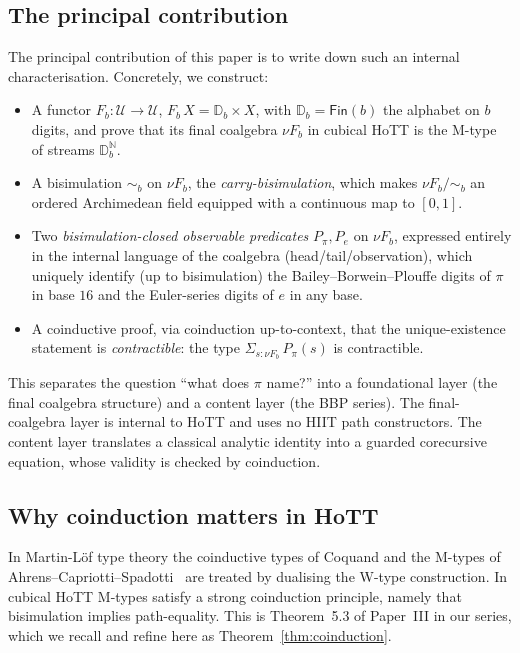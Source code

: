 \documentclass[12pt]{article}
\theoremstyle{definition}
\theoremstyle{remark}
\newcommand{\Type}{\mathcal{U}}
\newcommand{\N}{\mathbb{N}}
\newcommand{\D}{\mathbb{D}}
\newcommand{\bisim}{\mathrel{\sim}}
\begin{document}
\subsection{The principal contribution}

The principal contribution of this paper is to write down such an
internal characterisation. Concretely, we construct:

\begin{itemize}
\item A functor $F_b: \Type \to \Type$, $F_b\,X = \D_b \times X$, with
$\D_b = \mathsf{Fin}(b)$ the alphabet on $b$ digits, and prove that
its final coalgebra $\nu F_b$ in cubical HoTT is the M-type of
streams $\D_b^\N$.
\item A bisimulation $\bisim_b$ on $\nu F_b$, the
\emph{carry-bisimulation}, which makes $\nu F_b / \bisim_b$ an
ordered Archimedean field equipped with a continuous map to $[0,1]$.
\item Two \emph{bisimulation-closed observable predicates}
$P_\pi, P_e$ on $\nu F_b$, expressed entirely in the internal
language of the coalgebra (head/tail/observation), which uniquely
identify (up to bisimulation) the Bailey--Borwein--Plouffe digits of
$\pi$ in base $16$ and the Euler-series digits of $e$ in any base.
\item A coinductive proof, via coinduction up-to-context, that the
unique-existence statement is \emph{contractible}: the type
$\Sigma_{s : \nu F_b}\,P_\pi(s)$ is contractible.
\end{itemize}

This separates the question ``what does $\pi$ name?'' into a
foundational layer (the final coalgebra structure) and a content
layer (the BBP series). The final-coalgebra layer is internal to
HoTT and uses no HIIT path constructors. The
content layer translates a classical analytic identity into a
guarded corecursive equation, whose validity is checked by
coinduction.

\subsection{Why coinduction matters in HoTT}

In Martin-L\"of type theory the coinductive types of Coquand
and the M-types of Ahrens--Capriotti--Spadotti~\cite{ACS} are
treated by dualising the W-type construction. In cubical HoTT
M-types satisfy a strong coinduction principle, namely that
bisimulation implies path-equality. This is Theorem~5.3 of
Paper~III in our series, which we recall and refine here as
Theorem~\ref{thm:coinduction}.
\end{document}
